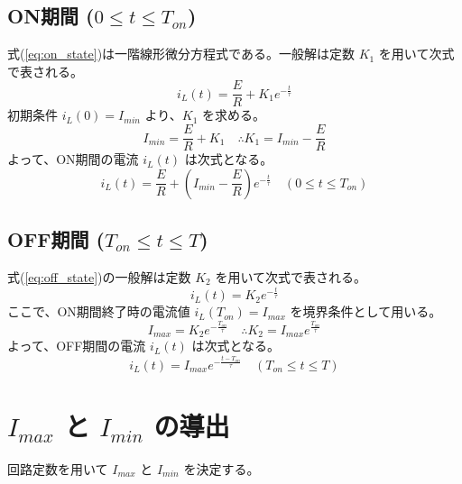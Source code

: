\documentclass[a4paper,10pt]{article}
\begin{document}
\subsection{ON期間 ($0 \le t \le T_{on}$)}
式(\ref{eq:on_state})は一階線形微分方程式である。一般解は定数 $K_1$ を用いて次式で表される。
\begin{equation}
    i_L(t) = \frac{E}{R} + K_1 e^{-\frac{t}{\tau}}
\end{equation}
初期条件 $i_L(0) = I_{min}$ より、$K_1$ を求める。
\begin{equation}
    I_{min} = \frac{E}{R} + K_1 \quad \therefore K_1 = I_{min} - \frac{E}{R}
\end{equation}
よって、ON期間の電流 $i_L(t)$ は次式となる。
\begin{equation}
    i_L(t) = \frac{E}{R} + \left( I_{min} - \frac{E}{R} \right) e^{-\frac{t}{\tau}} \quad (0 \le t \le T_{on})
    \label{eq:il_on}
\end{equation}

\subsection{OFF期間 ($T_{on} \le t \le T$)}
式(\ref{eq:off_state})の一般解は定数 $K_2$ を用いて次式で表される。
\begin{equation}
    i_L(t) = K_2 e^{-\frac{t}{\tau}}
\end{equation}
ここで、ON期間終了時の電流値 $i_L(T_{on}) = I_{max}$ を境界条件として用いる。
\begin{equation}
    I_{max} = K_2 e^{-\frac{T_{on}}{\tau}} \quad \therefore K_2 = I_{max} e^{\frac{T_{on}}{\tau}}
\end{equation}
よって、OFF期間の電流 $i_L(t)$ は次式となる。
\begin{equation}
    i_L(t) = I_{max} e^{-\frac{t - T_{on}}{\tau}} \quad (T_{on} \le t \le T)
    \label{eq:il_off}
\end{equation}

\section{$I_{max}$ と $I_{min}$ の導出}
回路定数を用いて $I_{max}$ と $I_{min}$ を決定する。
\end{document}
